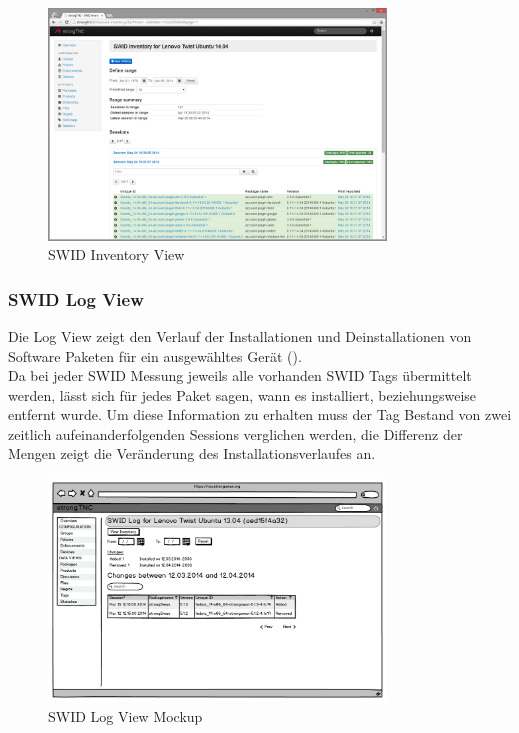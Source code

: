 \begin{figure}[H]
	\centering
	\includegraphics[width=0.8\textwidth]{./images/Views/inventory-view}
	\caption{SWID Inventory View}
	\label{fig:swid-inventory-view}
\end{figure}


\subsubsection{SWID Log View}
Die Log View zeigt den Verlauf der Installationen und Deinstallationen von Software Paketen für ein ausgewähltes Gerät ().\\
Da bei jeder SWID Messung jeweils alle vorhanden SWID Tags übermittelt werden,
lässt sich für jedes Paket sagen, wann es installiert, beziehungsweise entfernt
wurde. Um diese Information zu erhalten muss der Tag Bestand von zwei zeitlich
aufeinanderfolgenden Sessions verglichen werden, die Differenz der Mengen zeigt
die Veränderung des Installationsverlaufes an.

\begin{figure}[H]
	\centering
	\includegraphics[width=0.8\textwidth]{./images/mockups/swid-log}
	\caption{SWID Log View Mockup}
	\label{fig:swid-log}
\end{figure}

